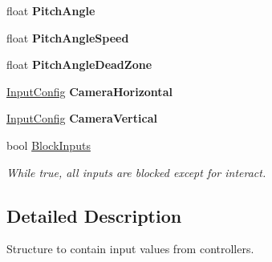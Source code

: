 \begin{DoxyCompactItemize}
\item 
\hypertarget{struct_skyrates_1_1_data_1_1_player_data_1_1_input_a4dcd8085c40cc739bdf0d75df7eeff74}{float {\bfseries Pitch\-Angle}}\label{struct_skyrates_1_1_data_1_1_player_data_1_1_input_a4dcd8085c40cc739bdf0d75df7eeff74}

\item 
\hypertarget{struct_skyrates_1_1_data_1_1_player_data_1_1_input_a538fcc6568fc266f3d5edee5770ce526}{float {\bfseries Pitch\-Angle\-Speed}}\label{struct_skyrates_1_1_data_1_1_player_data_1_1_input_a538fcc6568fc266f3d5edee5770ce526}

\item 
\hypertarget{struct_skyrates_1_1_data_1_1_player_data_1_1_input_ad0c5566ec9e0cd745119e4858abf6398}{float {\bfseries Pitch\-Angle\-Dead\-Zone}}\label{struct_skyrates_1_1_data_1_1_player_data_1_1_input_ad0c5566ec9e0cd745119e4858abf6398}

\item 
\hypertarget{struct_skyrates_1_1_data_1_1_player_data_1_1_input_ada55ddfe4b06f71afb84dbae481c4347}{\hyperlink{class_skyrates_1_1_data_1_1_player_data_1_1_input_config}{Input\-Config} {\bfseries Camera\-Horizontal}}\label{struct_skyrates_1_1_data_1_1_player_data_1_1_input_ada55ddfe4b06f71afb84dbae481c4347}

\item 
\hypertarget{struct_skyrates_1_1_data_1_1_player_data_1_1_input_a402017612cb89da0555e8423fe834424}{\hyperlink{class_skyrates_1_1_data_1_1_player_data_1_1_input_config}{Input\-Config} {\bfseries Camera\-Vertical}}\label{struct_skyrates_1_1_data_1_1_player_data_1_1_input_a402017612cb89da0555e8423fe834424}

\item 
bool \hyperlink{struct_skyrates_1_1_data_1_1_player_data_1_1_input_a2bdc93fb39026f0e848d02f5e4a7880c}{Block\-Inputs}
\begin{DoxyCompactList}\small\item\em While true, all inputs are blocked except for interact. \end{DoxyCompactList}\end{DoxyCompactItemize}


\subsection{Detailed Description}
Structure to contain input values from controllers. 



